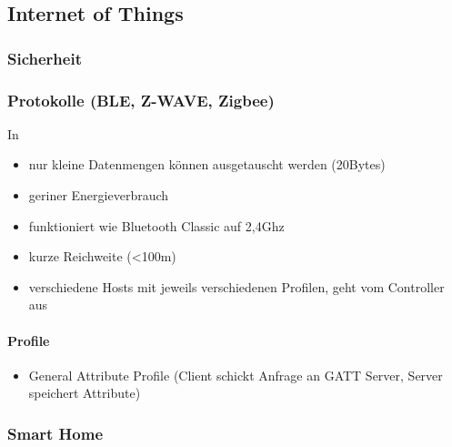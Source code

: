 \subsection{Internet of Things}
\label{sec:sota_iot}
\subsubsection{Sicherheit}
\label{sec:sota_iot_security}
\subsubsection{Protokolle (BLE, Z-WAVE, Zigbee)}
    \cite{Gomez2012}
    In \cite{Rose2016}
    \begin{itemize}
        \item nur kleine Datenmengen können ausgetauscht werden (20Bytes)\cite{Rose2016}
        \item geriner Energieverbrauch
        \item funktioniert wie Bluetooth Classic auf 2,4Ghz
        \item kurze Reichweite (<100m)
        \item verschiedene Hosts mit jeweils verschiedenen Profilen, geht vom Controller aus
    \end{itemize}
    
    \paragraph{Profile}\cite{Rose2016}
        \begin{itemize}
            \item General Attribute Profile (Client schickt Anfrage an GATT Server, Server speichert Attribute)
        \end{itemize}

\label{sec:sota_iot_protocols}
\subsubsection{Smart Home}
\label{sec:sota_iot_smart_home}